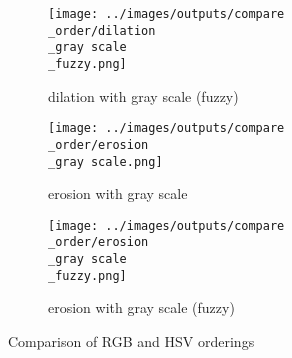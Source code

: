\begin{figure}[!ht]
\begin{subfigure}[t]{0.22\textwidth}
  \end{subfigure}
\begin{subfigure}[t]{0.22\textwidth}
    \texttt{[image: ../images/outputs/compare\\\_order/dilation\\\_gray scale\\\_fuzzy.png]}
    \caption{dilation with gray scale (fuzzy)}
    \centering
  \end{subfigure}
\begin{subfigure}[t]{0.22\textwidth}
    \texttt{[image: ../images/outputs/compare\\\_order/erosion\\\_gray scale.png]}
    \caption{erosion with gray scale}
    \centering
  \end{subfigure}
\begin{subfigure}[t]{0.22\textwidth}
    \texttt{[image: ../images/outputs/compare\\\_order/erosion\\\_gray scale\\\_fuzzy.png]}
    \caption{erosion with gray scale (fuzzy)}
    \centering
  \end{subfigure}
 \caption{Comparison of RGB and HSV orderings}
 \end{figure}
